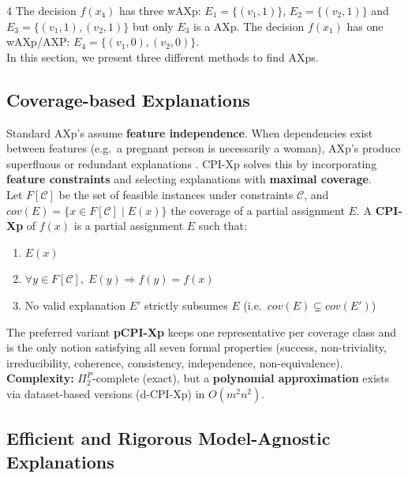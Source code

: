 \documentclass[a0,landscape]{a0poster}
\begin{document}
\begin{multicols}{4}
The decision $f(x_4)$ has three wAXp: $E_1 = \{(v_1, 1)\}$, $E_2 = \{(v_2, 1)\}$ and $E_3 = \{(v_1, 1), (v_2, 1)\}$ but only $E_3$ is a AXp. The decision $f(x_1)$ has one wAXp/AXP: $E_4 = \{(v_1, 0), (v_2, 0)\}$. \\


In this section, we present three different methods to find AXps.

\subsection*{Coverage-based Explanations}

Standard AXp's assume \textbf{feature independence}. When dependencies exist between features (e.g.\ a pregnant person is necessarily a woman), AXp's produce superfluous or redundant explanations \cite{cooper_abductive_2024}. CPI-Xp solves this by incorporating \textbf{feature constraints} and selecting explanations with \textbf{maximal coverage}. \\

Let $F[\mathcal{C}]$ be the set of feasible instances under constraints $\mathcal{C}$, and $cov(E) = \{x \in F[\mathcal{C}] \mid E(x)\}$ the coverage of a partial assignment $E$.
A \textbf{CPI-Xp} of $f(x)$ is a partial assignment $E$ such that:

\begin{enumerate}
    \item $E(x)$
    \item $\forall y \in F[\mathcal{C}],\; E(y) \Rightarrow f(y) = f(x)$
    \item No valid explanation $E'$ strictly subsumes $E$ (i.e.\ $cov(E) \subsetneq cov(E')$)
\end{enumerate}

\vspace{0.5cm}

The preferred variant \textbf{pCPI-Xp} keeps one representative per coverage class and is the only notion satisfying all seven formal properties (success, non-triviality, irreducibility, coherence, consistency, independence, non-equivalence). \\

\textbf{Complexity:} $\Pi_2^P$-complete (exact), but a \textbf{polynomial approximation} exists via dataset-based versions (d-CPI-Xp) in $O(m^2 n^2)$.
    



\subsection*{Efficient and Rigorous Model-Agnostic Explanations}


\end{multicols}
\end{document}
